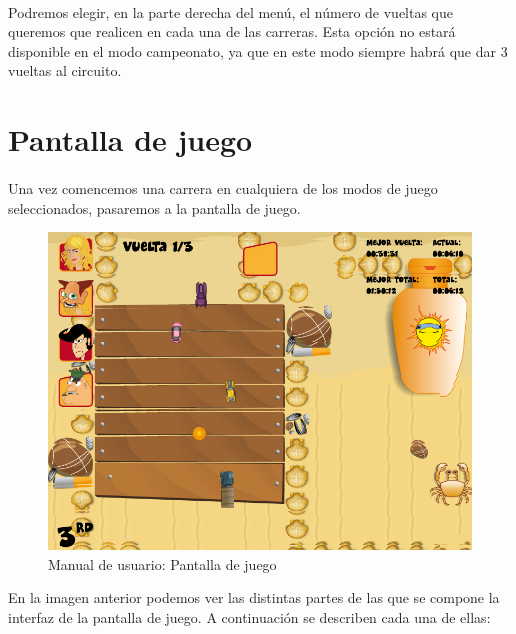 \paragraph{}
Podremos elegir, en la parte derecha del menú, el número de vueltas que queremos que realicen en cada una de las carreras. Esta opción
no estará disponible en el modo campeonato, ya que en este modo siempre habrá que dar 3 vueltas al circuito.

\section{Pantalla de juego}

\paragraph{}
Una vez comencemos una carrera en cualquiera de los modos de juego seleccionados, pasaremos a la pantalla de juego.

\begin{figure}[H]
  \label{pantalla_juego}
  \begin{center}
    \includegraphics[scale=0.4]{imagenes/capturas/pantalla_juego.png}
  \end{center}
 \caption{Manual de usuario: Pantalla de juego}
\end{figure}

En la imagen anterior podemos ver las distintas partes de las que se compone la interfaz de la pantalla de juego. A continuación
se describen cada una de ellas:

